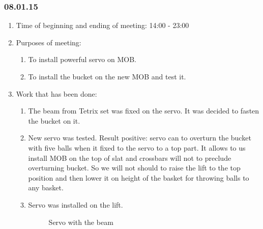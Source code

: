 \subsubsection{08.01.15}

\begin{enumerate}
	\item Time of beginning and ending of meeting: 14:00 - 23:00
	
	\item Purposes of meeting:  
	\begin{enumerate}
		
	  \item To install powerful servo on MOB.
		
	  \item To install the bucket on the new MOB and test it.
		
	\end{enumerate}
	
	\item Work that has been done:
	\begin{enumerate}
		
	  \item The beam from Tetrix set was fixed on the servo. It was decided to fasten the bucket on it.
		
	  \item New servo was tested. Result positive: servo can to overturn the bucket with five balls when it fixed to the servo to a top part. It allows to us install MOB on the top of slat and crossbars will not to preclude overturning bucket. So we will not should to raise the lift to the top position and then lower it on height of the basket  for throwing balls to any basket.
		
	  \item Servo was installed on the lift.
      \begin{figure}[H]
      	\begin{minipage}[h]{1\linewidth}
      		\caption{Servo with the beam}
      	\end{minipage}
     \end{figure}	
      

\end{enumerate}
\end{enumerate}
